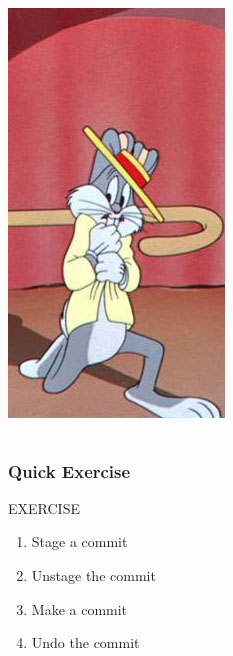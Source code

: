 \documentclass{beamer}
\begin{document}
\begin{frame}[fragile]
\begin{columns}
\includegraphics[width=\textwidth]{the-hook.jpg}
\end{columns}
\end{frame}

\begin{frame}[fragile]
\frametitle{Quick Exercise}
    \begin{block}{EXERCISE}
        \begin{enumerate}
        \item Stage a commit
        \item Unstage the commit
        \item Make a commit
        \item Undo the commit
        \end{enumerate}
    \end{block}

\end{frame}
\end{document}
